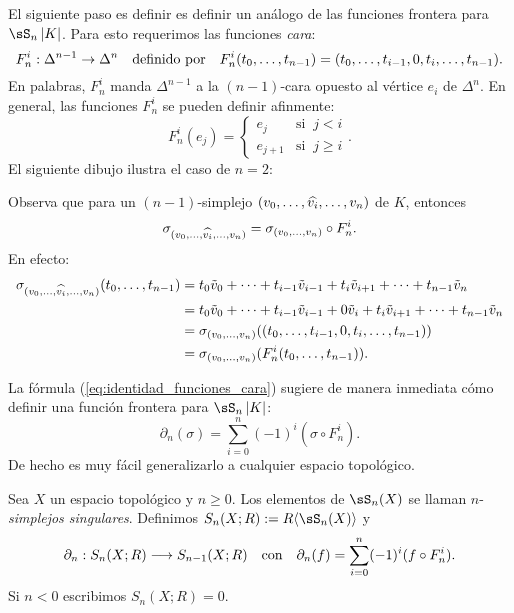 \documentclass[../../topologia_algebraica]{subfiles}
\begin{document}
El siguiente paso es definir es definir un an\'alogo de las funciones frontera para $\sS_n\abs{K}$. Para
esto requerimos las funciones \emph{cara}:
\[
  F^i_n:\Delta^{n-1}\rightarrow\Delta^n \quad\text{definido por}\quad
  F^i_n(t_0,\ldots,t_{n-1})=(t_0,\ldots,t_{i-1},0,t_i,\ldots,t_{n-1}).
\]
En palabras, $F^i_n$ manda $\Delta^{n-1}$ a la $(n-1)$-cara opuesto al v\'ertice $e_i$ de $\Delta^n$.
En general, las funciones $F^i_n$ se pueden definir afinmente:
\[
  F^i_n(e_j)=
  \begin{cases}
    e_j & \text{si}\;\; j<i \\
    e_{j+1} & \text{si}\;\; j\geq i
  \end{cases}.
\]
El siguiente dibujo ilustra el caso de $n=2$:
\begin{figure}[h!]%
  \centering
\end{figure}%

Observa que para un $(n-1)$-simplejo $(v_0,\ldots,\widehat{ v_i },\ldots,v_n)$ de $K$, entonces%
%
\begin{equation}\label{eq:identidad_funciones_cara}
  \sigma_{(v_0,\ldots,\widehat{ v_i },\ldots,v_n)}=\sigma_{(v_0,\ldots,v_n)}\circ F^i_n.
\end{equation}
%
En efecto:%
%
\begin{align*}
  \sigma_{(v_0,\ldots,\widehat{ v_i },\ldots,v_n)}(t_0,\ldots,t_{n-1})&=
  t_0\tilde{v}_0+\cdots+t_{i-1}\tilde{v}_{i-1}+t_{i}\tilde{v}_{i+1}+\cdots+t_{n-1}\tilde{v}_{n}\\ &=
  t_0\tilde{v}_0+\cdots+t_{i-1}\tilde{v}_{i-1}+0\tilde{v}_i + t_{i}\tilde{v}_{i+1}+\cdots+
  t_{n-1}\tilde{v}_{n}\\ &=
  \sigma_{(v_0,\ldots,v_n)}((t_0,\ldots,t_{i-1},0,t_i,\ldots,t_{n-1}))\\ &=
  \sigma_{(v_0,\ldots,v_n)}(F^i_n(t_0,\ldots,t_{n-1})).
\end{align*}

La f\'ormula (\ref{eq:identidad_funciones_cara}) sugiere de manera inmediata c\'omo definir una
funci\'on frontera para $\sS_n\abs{K}$:
\[
  \partial_n(\sigma)=\sum_{i=0}^n(-1)^i (\sigma\circ F^i_n).
\]
De hecho es muy f\'acil generalizarlo a cualquier espacio topol\'ogico.

\begin{defin}
  Sea $X$ un espacio topol\'ogico y $n\geq 0$. Los elementos de $\sS_n(X)$ se llaman
  $n$-\emph{simplejos singulares}.
  Definimos $S_n(X;R):=R\gen{\sS_n(X)}$ y
  \[
    \partial_n:S_n(X;R)\longrightarrow S_{n-1}(X;R) \quad\text{con}\quad
    \partial_n(f)=\sum_{i=0}^n(-1)^i (f\circ F^i_n).
  \]
  Si $n<0$ escribimos $S_n(X;R)=0$.
\end{defin}
\end{document}
